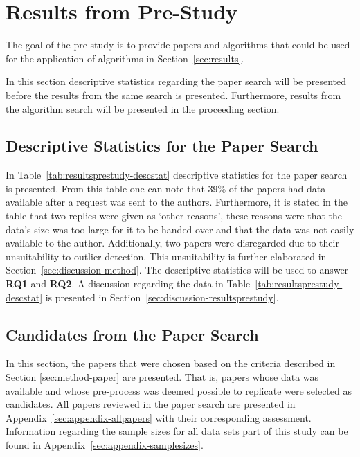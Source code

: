 ﻿\section{Results from Pre-Study}
\label{sec:resultsprestudy}
The goal of the pre-study is to provide papers and algorithms that could be used for the application of algorithms in Section~\ref{sec:results}.




In this section descriptive statistics regarding the paper search will be presented before the results from the same search is presented. Furthermore, results from the algorithm search will be presented in the proceeding section.




\subsection{Descriptive Statistics for the Paper Search}
\label{sec:resultsprestudy-descriptive}
In Table~\ref{tab:resultsprestudy-descstat} descriptive statistics for the paper search is presented. From this table one can note that 39\% of the papers had data available after a request was sent to the authors. Furthermore, it is stated in the table that two replies were given as `other reasons', these reasons were that the data's size was too large for it to be handed over and that the data was not easily available to the author. Additionally, two papers were disregarded due to their unsuitability to outlier detection. This unsuitability is further elaborated in Section~\ref{sec:discussion-method}. The descriptive statistics will be used to answer \textbf{RQ1} and \textbf{RQ2}. A discussion regarding the data in Table~\ref{tab:resultsprestudy-descstat} is presented in Section~\ref{sec:discussion-resultsprestudy}.





\subsection{Candidates from the Paper Search}
In this section, the papers that were chosen based on the criteria described in Section \ref{sec:method-paper} are presented. That is, papers whose data was available and whose pre-process was deemed possible to replicate were selected as candidates. All papers reviewed in the paper search are presented in Appendix~\ref{sec:appendix-allpapers} with their corresponding assessment. Information regarding the sample sizes for all data sets part of this study can be found in Appendix~\ref{sec:appendix-samplesizes}.


